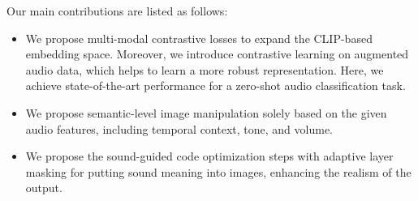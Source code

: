 \documentclass[10pt,twocolumn,letterpaper]{article}
\def\authornote#1#2#3{{\textcolor{#2}{\textsl{\small[#1: #3]}}}}
\newcommand{\wonmin}[1]{\authornote{Wonmin}{Blue}{#1}} %
\begin{document}
Our main contributions are listed as follows: 
\begin{itemize}
    \vspace{-0.7em}
    \item We propose multi-modal contrastive losses to expand the CLIP-based embedding space. Moreover, we introduce contrastive learning on augmented audio data, which helps to learn a more robust representation. Here, we achieve state-of-the-art performance for a zero-shot audio classification task.\vspace{-0.7em}
    \item We propose semantic-level image manipulation solely based on the given audio features, including temporal context, tone, and volume.\vspace{-0.7em}%
    \item We propose the sound-guided code optimization steps with adaptive layer masking for putting sound meaning into images, enhancing the realism of the output.\vspace{-0.7em}
\end{itemize}
\end{document}
